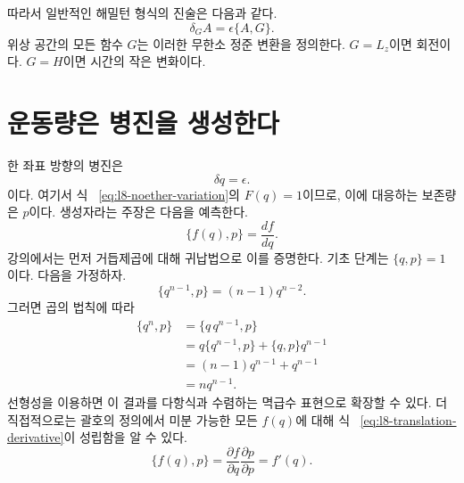따라서 일반적인 해밀턴 형식의 진술은 다음과 같다. \begin{equation}
  \boxed{\delta_G A=\epsilon\{A,G\}.}
  \label{eq:l8-generator-rule}
\end{equation} 위상 공간의 모든 함수 \(G\)는 이러한 무한소 정준 변환을 정의한다. \(G=L_z\)이면 회전이다. \(G=H\)이면 시간의 작은 변화이다.

\begin{classroomqa} \end{classroomqa}

\section{운동량은 병진을 생성한다}

한 좌표 방향의 병진은 \begin{equation}
  \delta q=\epsilon.
  \label{eq:l8-q-translation}
\end{equation}이다. 여기서 식 ~\eqref{eq:l8-noether-variation}의 \(F(q)=1\)이므로, 이에 대응하는 보존량은 \(p\)이다. 생성자라는 주장은 다음을 예측한다. \begin{equation}
  \{f(q),p\}=\frac{df}{dq}.
  \label{eq:l8-translation-derivative}
\end{equation} 강의에서는 먼저 거듭제곱에 대해 귀납법으로 이를 증명한다. 기초 단계는 \(\{q,p\}=1\)이다. 다음을 가정하자. \begin{equation}
  \{q^{n-1},p\}=(n-1)q^{n-2}.
  \label{eq:l8-induction-hypothesis}
\end{equation} 그러면 곱의 법칙에 따라 \begin{align}
  \{q^n,p\}
  &=\{q\,q^{n-1},p\}\\
  &=q\{q^{n-1},p\}+\{q,p\}q^{n-1}\\
  &=(n-1)q^{n-1}+q^{n-1}\\
  &=nq^{n-1}.
  \label{eq:l8-power-translation}
\end{align} 선형성을 이용하면 이 결과를 다항식과 수렴하는 멱급수 표현으로 확장할 수 있다. 더 직접적으로는 괄호의 정의에서 미분 가능한 모든 \(f(q)\)에 대해 식 ~\eqref{eq:l8-translation-derivative}이 성립함을 알 수 있다. \begin{equation}
  \{f(q),p\}
  =
  \frac{\partial f}{\partial q}
  \frac{\partial p}{\partial p}
  =f'(q).
\end{equation}

